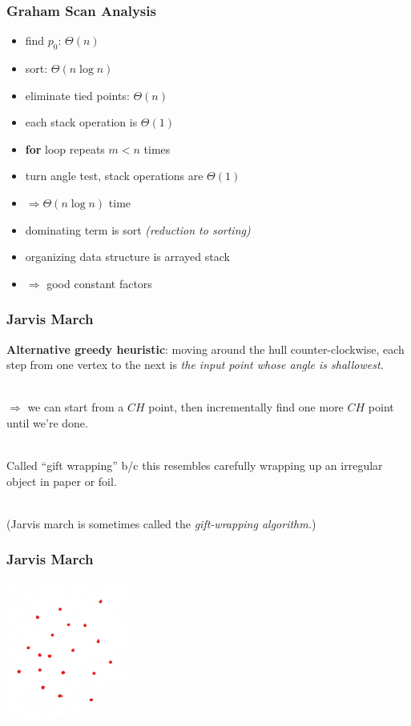 \documentclass{beamer}
\newcommand{\stanza}{ \\~\ }
\begin{document}
\begin{frame} \frametitle{Graham Scan Analysis}
\begin{itemize}
  \item find $p_0$: $\Theta(n)$
  \item sort: $\Theta(n \log n)$
  \item eliminate tied points: $\Theta(n)$
  \item each stack operation is $\Theta(1)$
  \item \textbf{for} loop repeats $m < n$ times
  \item turn angle test, stack operations are $\Theta(1)$
  \item $\Rightarrow \Theta(n \log n)$ time
  \item dominating term is sort \emph{(reduction to sorting)}
  \item organizing data structure is arrayed stack
  \item $\Rightarrow$ good constant factors
\end{itemize}
\end{frame}

\begin{frame} \frametitle{Jarvis March}
\textbf{Alternative greedy heuristic}: moving around the hull counter-clockwise,
 each step from one vertex to the next is
 \emph{the input point whose angle is shallowest.} \stanza

 $\Rightarrow$ we can start from a $CH$ point, then incrementally find one more $CH$
 point until we're done. \stanza

 Called ``gift wrapping'' b/c this resembles carefully wrapping up an irregular
 object in paper or foil. \stanza 

 (Jarvis march is sometimes called the \emph{gift-wrapping algorithm.})
\end{frame}

\begin{frame} \frametitle{Jarvis March}
  \begin{center}
    \includegraphics[width=4cm]{convex_hull_input.jpg}
  \end{center}
\end{frame}
\end{document}
